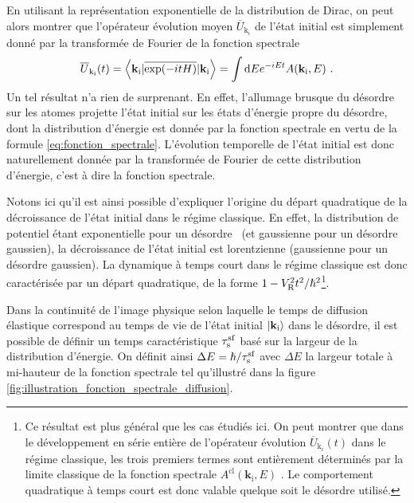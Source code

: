 En utilisant la représentation exponentielle de la distribution de Dirac, on peut alors montrer que l'opérateur évolution moyen $\overline{U}_{\mathrm{k}_i}$ de l'état initial est simplement donné par la transformée de Fourier de la fonction spectrale
\begin{equation}
\overline{U}_{\mathrm{k}_{\mathrm{i}}}(t)=\left\langle \mathbf{k}_{\mathrm{i}} | \overline{\exp(-itH)}  | \mathbf{k}_{\mathrm{i}} \right\rangle = \int{\mathop{}\mathopen{}\mathrm{d}E e^{-iEt} A(\mathbf{k}_{\mathrm{i}},E)} \text{ .}
\end{equation}
Un tel résultat n'a rien de surprenant. En effet, l'allumage brusque du désordre sur les atomes projette l'état initial sur les états d'énergie propre du désordre, dont la distribution d'énergie est donnée par la fonction spectrale en vertu de la formule \ref{eq:fonction_spectrale}. L'évolution temporelle de l'état initial est donc naturellement donnée par la transformée de Fourier de cette distribution d'énergie, c'est à dire la fonction spectrale. 

Notons ici qu'il est ainsi possible d'expliquer l'origine du départ quadratique de la décroissance de l'état initial dans le régime classique. En effet, la distribution de potentiel étant exponentielle pour un désordre \speckle\ (et gaussienne pour un désordre gaussien), la décroissance de l'état initial est lorentzienne (gaussienne pour un désordre gaussien). La dynamique à temps court dans le régime classique est donc caractérisée par un départ quadratique, de la forme $1-V_{\mathrm{R}}^2t^2/\hslash^2$\footnote{Ce résultat est plus général que les cas étudiés ici. On peut montrer que dans le développement en série entière de l'opérateur évolution $\overline{U}_{\mathrm{k}_i}(t)$ dans le régime classique, les trois premiers termes sont entièrement déterminés par la limite classique de la fonction spectrale $A^{\mathrm{cl}}(\mathbf{k}_{\mathrm{i}},E)$ \citep{trappe2015semiclassical}. Le comportement quadratique à temps court est donc valable quelque soit le désordre utilisé. }.

Dans la continuité de l'image physique selon laquelle le temps de diffusion élastique correspond au temps de vie de l'état initial $\left| \mathbf{k}_{\mathrm{i}} \right\rangle$ dans le désordre, il est possible de définir un temps caractéristique $\tau_{\mathrm{s}}^{\mathrm{sf}}$ basé sur la largeur de la distribution d'énergie. On définit ainsi $\Delta E = \hslash/\tau_{\mathrm{s}}^{\mathrm{sf}}$ avec $\Delta E$ la largeur totale à mi-hauteur de la fonction spectrale tel qu'illustré dans la figure \ref{fig:illustration_fonction_spectrale_diffusion}. 

